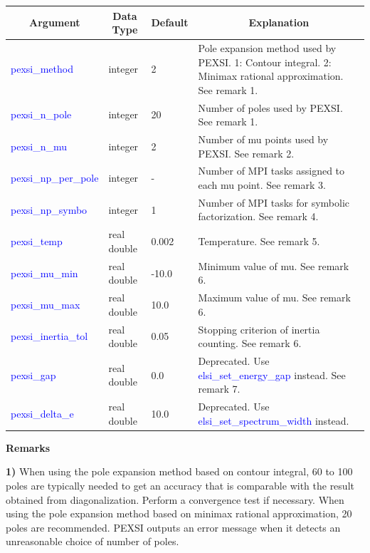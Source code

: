 \documentclass{report}
\newcommand{\tcb}[1]{\textcolor{blue}{#1}}
\begin{document}
\begin{tabular}[]{|p{30mm}|p{20mm}|p{15mm}|p{100mm}|}
\hline
\multicolumn{1}{|c|}{\textbf{Argument}} & \multicolumn{1}{c|}{\textbf{Data Type}} & \multicolumn{1}{c|}{\textbf{Default}} & \multicolumn{1}{c|}{\textbf{Explanation}}\\
\hline
\tcb{pexsi\_method}        & integer     & 2     & Pole expansion method used by PEXSI. 1: Contour integral. 2: Minimax rational approximation. See remark 1.\\
\hline
\tcb{pexsi\_n\_pole}       & integer     & 20    & Number of poles used by PEXSI. See remark 1.\\
\hline
\tcb{pexsi\_n\_mu}         & integer     & 2     & Number of mu points used by PEXSI. See remark 2.\\
\hline
\tcb{pexsi\_np\_per\_pole} & integer     & -     & Number of MPI tasks assigned to each mu point. See remark 3.\\
\hline
\tcb{pexsi\_np\_symbo}     & integer     & 1     & Number of MPI tasks for symbolic factorization. See remark 4.\\
\hline
\tcb{pexsi\_temp}          & real double & 0.002 & Temperature. See remark 5.\\
\hline
\tcb{pexsi\_mu\_min}       & real double & -10.0 & Minimum value of mu. See remark 6.\\
\hline
\tcb{pexsi\_mu\_max}       & real double & 10.0  & Maximum value of mu. See remark 6.\\
\hline
\tcb{pexsi\_inertia\_tol}  & real double & 0.05  & Stopping criterion of inertia counting. See remark 6.\\
\hline
\tcb{pexsi\_gap}           & real double & 0.0   & Deprecated. Use \tcb{elsi\_set\_energy\_gap} instead. See remark 7.\\
\hline
\tcb{pexsi\_delta\_e}      & real double & 10.0  & Deprecated. Use \tcb{elsi\_set\_spectrum\_width} instead.\\
\hline
\end{tabular}

\textbf{Remarks}

\textbf{1)} When using the pole expansion method based on contour integral, 60 to 100 poles are typically needed to get an accuracy that is comparable with the result obtained from diagonalization. Perform a convergence test if necessary. When using the pole expansion method based on minimax rational approximation, 20 poles are recommended. PEXSI outputs an error message when it detects an unreasonable choice of number of poles.
\end{document}
